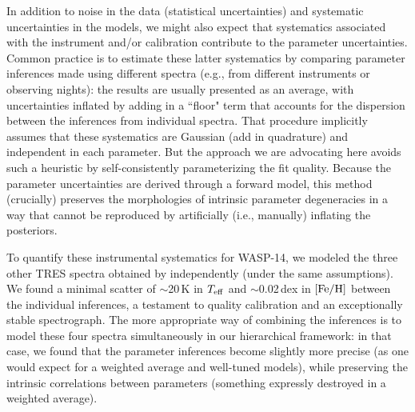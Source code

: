 \documentclass[iop,floatfix]{emulateapj}
\newcommand{\Z}{[{\rm Fe}/{\rm H}]}
\newcommand{\comm}[1]{ \textcolor{red}{SA: #1}}
\begin{document}
In addition to noise in the data (statistical uncertainties) and systematic uncertainties in the 
models, we might also expect that systematics associated with the instrument and/or calibration 
contribute to the parameter uncertainties.  Common practice is to estimate these latter systematics 
by comparing parameter inferences made using different spectra (e.g., from different instruments or 
observing nights): the results are usually presented as an average, with uncertainties inflated by 
adding in a ``floor" term that accounts for the dispersion between the inferences from individual 
spectra.  That procedure implicitly assumes that these systematics are Gaussian (add in quadrature) 
and independent in each parameter.  But the approach we are advocating here avoids such a heuristic 
by self-consistently parameterizing the fit quality.  Because the parameter uncertainties are 
derived through a forward model, this method (crucially) preserves the morphologies of intrinsic 
parameter degeneracies in a way that cannot be reproduced by artificially (i.e., manually) 
inflating the posteriors.  

To quantify these instrumental systematics for WASP-14, we modeled the three other TRES spectra 
obtained by \citet{torres12} independently (under the same assumptions).  We found a minimal 
scatter of $\sim$20\,K in $T_{\rm eff}$ and $\sim$0.02\,dex in $\Z$ between the individual 
inferences, a testament to quality calibration and an exceptionally stable spectrograph.  The more 
appropriate way of combining the inferences is to model these four spectra simultaneously in our 
hierarchical framework: in that case, we found that the parameter inferences become slightly more 
precise (as one would expect for a weighted average and well-tuned models), while preserving the 
intrinsic correlations between parameters (something expressly destroyed in a weighted average).

\end{document}
